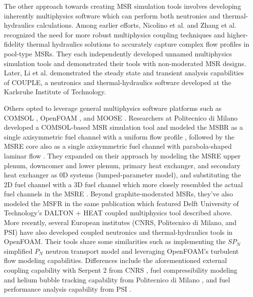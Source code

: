 The other approach towards creating \gls{MSR} simulation tools involves
developing inherently multiphysics software which can perform both
neutronics and thermal-hydraulics calculations. Among earlier efforts,
Nicolino et al. \cite{nicolino_coupled_2008} and Zhang et al.
\cite{zhang_development_2009} recognized the
need for more robust multiphysics coupling techniques and higher-fidelity
thermal hydraulics solutions to accurately capture complex flow profiles in
pool-type \glspl{MSR}. They each independently developed unnamed multiphysics
simulation tools and demonstrated their tools with non-moderated \gls{MSR}
designs. Later, Li et al. \cite{li_transient_2015} demonstrated the steady
state and transient analysis capabilities of COUPLE, a neutronics and
thermal-hydraulics software developed at the Karlsruhe Institute of Technology. 

Others opted to leverage general multiphysics software platforms such as
COMSOL \cite{comsol_ab_comsol_2018}, OpenFOAM \cite{openfoam_openfoam_2021},
and \gls{MOOSE} \cite{permann_moose_2020}. Researchers at Politecnico di
Milano developed a COMSOL-based \gls{MSR} simulation tool and modeled the
\gls{MSBR} as a single axisymmetric fuel channel with a uniform flow profile
\cite{cammi_multi-physics_2011}, followed by the \gls{MSRE} core also as a
single axisymmetric fuel channel with parabola-shaped laminar flow
\cite{cammi_dimensional_2012}. They expanded on their approach by modeling the
\gls{MSRE} upper plenum, downcomer and lower plenum, primary heat exchanger,
and secondary heat exchanger as 0D systems (lumped-parameter model), and
substituting the 2D fuel channel with a 3D fuel channel which more closely
resembled the actual fuel channels in the \gls{MSRE}
\cite{zanetti_geometric_2015}. Beyond graphite-moderated \glspl{MSR}, they've
also modeled the \gls{MSFR} in the same publication which featured Delft
University of Technology's DALTON + HEAT coupled multiphysics tool described
above. More recently, several European institutes (\gls{CNRS}, Politecnico di
Milano, and \gls{PSI}) have also developed coupled neutronics and
thermal-hydraulics tools in OpenFOAM. Their tools share some
similarities such as implementing the $SP_N$ simplified $P_N$ neutron transport
model and leveraging OpenFOAM's turbulent flow modeling capabilities.
Differences include the aforementioned external coupling capability with
Serpent 2 from \gls{CNRS} \cite{blanco_neutronic_2020}, fuel
compressibility modeling and helium bubble tracking capability from Politecnico
di Milano \cite{cervi_development_2019}, and fuel performance analysis
capability from \gls{PSI} \cite{fiorina_creation_2018}.

